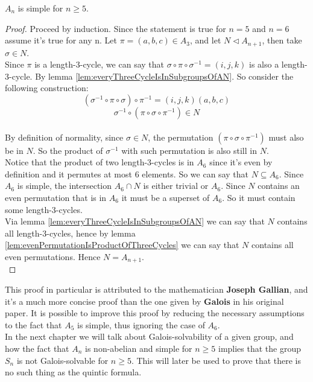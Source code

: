 \begin{theorem}[Simplicity of $A_n$]
    $A_n$ is simple for $n \geq 5$.
\end{theorem}
\begin{proof}
    Proceed by induction. Since the statement is true for $n = 5$ and $n = 6$ assume it's true for 
    any n. Let $\pi = (a,b,c) \in A_3$, and let $N \triangleleft A_{n+1}$, then take 
    $\sigma \in N$.\\

    Since $\pi$ is a length-3-cycle, we can say that $\sigma \circ \pi \circ \sigma^{-1} = (i,j,k)$
    is also a length-3-cycle. By lemma \ref{lem:everyThreeCycleIsInSubgroupsOfAN}. So consider the 
    following construction:\\

    $$ (\sigma^{-1} \circ \pi \circ \sigma) \circ \pi^{-1} = (i,j,k)(a,b,c) $$
    $$ \sigma^{-1} \circ (\pi \circ \sigma \circ \pi^{-1}) \in N $$ \\

    By definition of normality, since $\sigma \in N$, the permutation $(\pi \circ \sigma \circ \pi^{-1})$ 
    must also be in $N$. So the product of $\sigma^{-1}$ with such permutation is also still in $N$. \\

    Notice that the product of two length-3-cycles is in $A_6$ since it's even by definition and 
    it permutes at most 6 elements. So we can say that $N \subseteq A_6$. Since $A_6$ is simple,
    the intersection $A_6 \cap N$ is either trivial or $A_6$. Since $N$ contains an even permutation
    that is in $A_6$ it must be a superset of $A_6$. So it must contain some length-3-cycles. \\

    Via lemma \ref{lem:everyThreeCycleIsInSubgroupsOfAN} we can say that $N$ contains all
    length-3-cycles, hence by lemma \ref{lem:evenPermutationIsProductOfThreeCycles} we can say 
    that $N$ contains all even permutations. Hence $N = A_{n+1}$. \\
\end{proof} \vspace{0.2em}
    
This proof in particular is attributed to the mathematician \textbf{Joseph Gallian}, and it's a much 
more concise proof than the one given by \textbf{Galois} in his original paper. It is possible 
to improve this proof by reducing the necessary assumptions to the fact that $A_5$ is simple, thus 
ignoring the case of $A_6$. \\

In the next chapter we will talk about Galois-solvability of a given group, and how the fact that 
$A_n$ is non-abelian and simple for $n \geq 5$ implies that the group $S_n$ is not 
Galois-solvable for $n \geq 5$. This will later be used to prove that there is no such thing 
as the quintic formula. \\

\newpage
